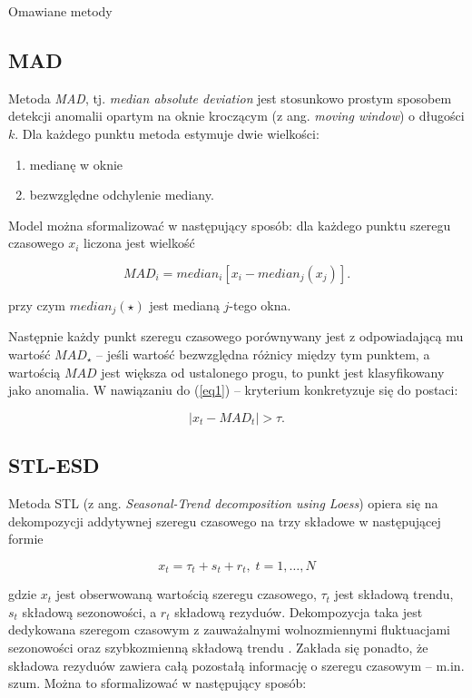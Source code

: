 \documentclass{article}
\begin{document}
Omawiane metody

\subsection{MAD}

Metoda \emph{MAD}, tj. \emph{median absolute deviation} jest stosunkowo
prostym sposobem detekcji anomalii opartym na oknie kroczącym (z ang.
\emph{moving window}) o długości \(k\). Dla każdego punktu metoda estymuje
dwie wielkości:

\begin{enumerate}
\item
  medianę w oknie
\item
  bezwzględne odchylenie mediany.
\end{enumerate}


Model można sformalizować w następujący sposób:
dla każdego punktu szeregu czasowego \(x_{i}\) liczona jest wielkość

\begin{equation*}
MAD_{i} = median_{i}[x_{i} - median_{j}(x_{j})].
\end{equation*}

przy czym $median_{j}(\star)$ jest medianą $j$-tego okna.

Następnie każdy punkt szeregu czasowego porównywany jest z odpowiadającą
mu wartość \(MAD_{\star}\) -- jeśli wartość bezwzględna różnicy między
tym punktem, a wartością \(MAD\) jest większa od ustalonego progu, to
punkt jest klasyfikowany jako anomalia. W nawiązaniu do (\ref{eq1}) -- kryterium
konkretyzuje się do postaci:

\begin{equation*}
|x_{t} - MAD_{t}| > \tau.
\end{equation*}

\hypertarget{stl-esd}{%
\subsection{STL-ESD}\label{stl-esd}}

Metoda STL (z ang. \emph{Seasonal-Trend decomposition using Loess})
opiera się na dekompozycji addytywnej szeregu czasowego na trzy składowe
w następującej formie

\begin{equation*}
x_{t} = \tau_{t} + s_{t} + r_{t},\; t = 1, \dots, N
\end{equation*}



gdzie \(x_{t}\) jest obserwowaną wartością szeregu czasowego,
\(\tau_{t}\) jest składową trendu, \(s_{t}\) składową sezonowości, a
\(r_{t}\) składową rezyduów. Dekompozycja taka jest dedykowana szeregom
czasowym z zauważalnymi wolnozmiennymi fluktuacjami sezonowości oraz
szybkozmienną składową trendu \cite{wen-gao}. Zakłada się
ponadto, że składowa rezyduów zawiera całą pozostałą informację o
szeregu czasowym -- m.in. szum. Można to sformalizować w następujący
sposób:
\end{document}
